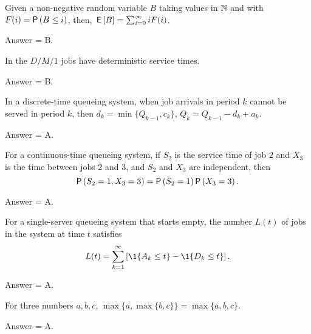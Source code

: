 \begin{exercise}[201802]
Given a non-negative random variable $B$ taking values in $\mathbb{N}$ and with $F(i) = \P{B\leq i}$, 
then, $\,\mathsf{E}\left[B\right] = \sum_{i=0}^\infty i F(i)$.
\begin{solution}
Answer = B.
\end{solution}
\end{exercise}

\begin{exercise}[201802]
In the  $D/M/1$ jobs have deterministic service times.
\begin{solution}
Answer = B.
\end{solution}
\end{exercise}

\begin{exercise}[201802]
In a discrete-time queueing system, when job arrivals in period $k$ cannot be served in period $k$, then $d_k = \min\{Q_{k-1}, c_k\}$, $Q_k = Q_{k-1} -d_k + a_k.$
\begin{solution}
Answer = A.
\end{solution}
\end{exercise}

\begin{exercise}[201802]
For a continuous-time queueing system, if $S_2$ is the service time of job $2$ and $X_3$ is the time between jobs 2 and 3, and $S_2$ and $X_3$ are independent, then
\begin{equation*}
  \P{S_{2}=1, X_3=3} = \P{S_{2}=1}\P{X_3=3}.
\end{equation*}
\begin{solution}
Answer = A.
\end{solution}
\end{exercise}

\begin{exercise}[201802]
For a single-server queueing system that starts empty,  the number $L(t)$ of jobs in the system at time $t$ satisfies
  \begin{equation*}
      L(t) = \sum_{k=1}^\infty \left[\1{A_k \leq t} -  \1{D_k \leq t}\right].
  \end{equation*}
\begin{solution}
Answer = A.
\end{solution}
\end{exercise}


\begin{exercise}[201802]
For three numbers $a,b,c$, $\max\{a, \max\{b, c\}\} = \max\{a, b, c\}$. 
\begin{solution}
Answer = A.
\end{solution}
\end{exercise}

